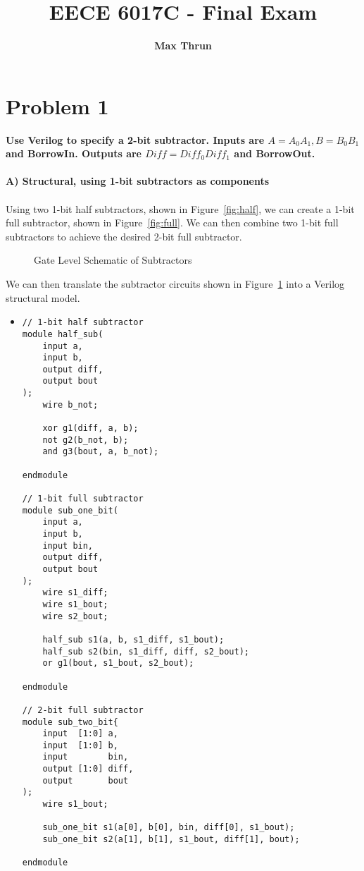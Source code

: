 \documentclass{article}
\title{
    \vspace{2in}
    \textmd{\textbf{EECE 6017C - Final Exam}}\\
    \vspace{4in}
}
\author{\textbf{Max Thrun}}
\begin{document}
\maketitle
\newpage

\section*{Problem 1}

\textbf{Use Verilog to specify a 2-bit subtractor. Inputs are $A = A_{0}A_{1}, B = B_{0}B_{1}$ and BorrowIn. Outputs are $Diff = Diff_{0}Diff_{1}$ and BorrowOut.}
\\\\
\textbf{A) Structural, using 1-bit subtractors as components}
\\\\
Using two 1-bit half subtractors, shown in Figure~\ref{fig:half}, we can create a 1-bit full subtractor, shown in Figure~\ref{fig:full}. We can then
combine two 1-bit full subtractors to achieve the desired 2-bit full subtractor.
\\
\begin{figure}[H]
\centering
{}
\hspace{1cm}
\caption{Gate Level Schematic of Subtractors}\label{fig:sub}
\end{figure}

We can then translate the subtractor circuits shown in Figure~\ref{fig:sub} into a Verilog structural model.
\begin{itemize}
\item[]
\begin{lstlisting}[caption=Structural 2-Bit Subtractor]
// 1-bit half subtractor
module half_sub(
    input a,
    input b,
    output diff,
    output bout
);
    wire b_not;

    xor g1(diff, a, b);
    not g2(b_not, b);
    and g3(bout, a, b_not);

endmodule

// 1-bit full subtractor
module sub_one_bit(
    input a, 
    input b, 
    input bin, 
    output diff, 
    output bout
);
    wire s1_diff;
    wire s1_bout;
    wire s2_bout;

    half_sub s1(a, b, s1_diff, s1_bout);
    half_sub s2(bin, s1_diff, diff, s2_bout);
    or g1(bout, s1_bout, s2_bout);

endmodule

// 2-bit full subtractor
module sub_two_bit{
    input  [1:0] a,
    input  [1:0] b,
    input        bin,
    output [1:0] diff,
    output       bout
);
    wire s1_bout;

    sub_one_bit s1(a[0], b[0], bin, diff[0], s1_bout);
    sub_one_bit s2(a[1], b[1], s1_bout, diff[1], bout);

endmodule
\end{lstlisting}
\end{itemize}
\end{document}
